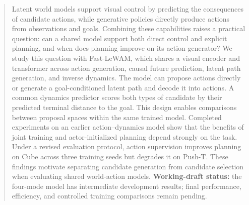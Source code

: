 \begin{abstract}
Latent world models support visual control by predicting the consequences of candidate actions, while generative policies directly produce actions from observations and goals. Combining these capabilities raises a practical question: can a shared model support both direct control and explicit planning, and when does planning improve on its action generator?
We study this question with Fast-LeWAM, which shares a visual encoder and transformer across action generation, causal future prediction, latent path generation, and inverse dynamics.
The model can propose actions directly or generate a goal-conditioned latent path and decode it into actions. A common dynamics predictor scores both types of candidate by their predicted terminal distance to the goal.
This design enables comparisons between proposal spaces within the same trained model.
Completed experiments on an earlier action--dynamics model show that the benefits of joint training and actor-initialized planning depend strongly on the task. Under a revised evaluation protocol, action supervision improves planning on Cube across three training seeds but degrades it on Push-T.
These findings motivate separating candidate generation from candidate selection when evaluating shared world-action models.
\textbf{Working-draft status:} the four-mode model has intermediate development results; final performance, efficiency, and controlled training comparisons remain pending.
\end{abstract}
